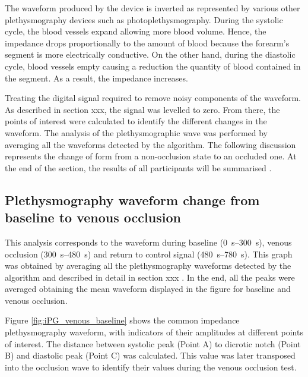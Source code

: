The waveform produced by the device is inverted as represented by various other plethysmography devices such as photoplethysmography. During the systolic cycle, the blood vessels expand allowing more blood volume. Hence, the impedance drops proportionally to the amount of blood because the forearm's segment is more electrically conductive. On the other hand, during the diastolic cycle, blood vessels empty causing a reduction the quantity of blood contained in the segment. As a result, the impedance increases.  

Treating the digital signal required to remove noisy components of the waveform. As described in section xxx, the signal was levelled to zero.  From there, the points of interest were calculated to identify the different changes in the waveform. The analysis of the plethysmographic wave was performed by averaging all the waveforms detected by the algorithm. The following discussion represents the change of form from a non-occlusion state to an occluded one. At the end of the section, the results of all participants will be summarised .

\subsection{Plethysmography waveform change from baseline to venous occlusion}
\label{section results 3.1}
This analysis corresponds to the waveform during baseline (\SIrange{0}{300}{\second}), venous occlusion (\SIrange{300}{480}{\second}) and return to control signal (\SIrange{480}{780}{\second}). This graph was obtained by averaging all the plethysmography waveforms detected by the algorithm and described in detail in section xxx . In the end, all the peaks were averaged obtaining the mean waveform displayed in the figure for baseline and venous occlusion.

Figure \ref{fig:iPG_venous_baseline} shows the common impedance plethysmography waveform, with indicators of their amplitudes at different points of interest. The distance between systolic peak (Point A) to dicrotic notch (Point B) and diastolic peak (Point C) was calculated. This value was later transposed into the occlusion wave to identify their values during the venous occlusion test.

